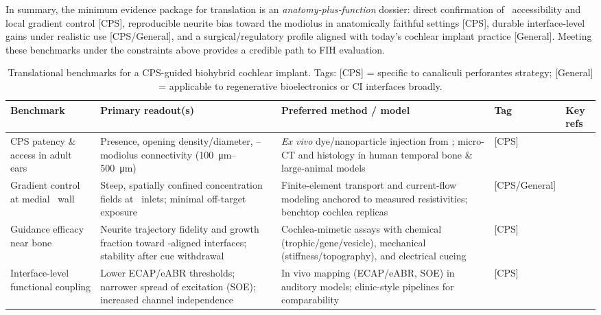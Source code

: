 In summary, the minimum evidence package for translation is an \emph{anatomy‑plus‑function} dossier: direct confirmation of \CPS\ accessibility and local gradient control [CPS], reproducible neurite bias toward the modiolus in anatomically faithful settings [CPS], durable interface‑level gains under realistic use [CPS/General], and a surgical/regulatory profile aligned with today’s cochlear implant practice [General]. Meeting these benchmarks under the constraints above provides a credible path to FIH evaluation.


\begin{table*}[t]
	\caption{Translational benchmarks for a CPS-guided biohybrid cochlear implant. Tags: [CPS] = specific to canaliculi perforantes strategy; [General] = applicable to regenerative bioelectronics or CI interfaces broadly.}
	\centering
	\renewcommand{\arraystretch}{1.2}
	\begin{tabular}{p{} p{} p{} p{} p{}}
		\hline
		\textbf{Benchmark} & \textbf{Primary readout(s)} & \textbf{Preferred method / model} & \textbf{Tag} & \textbf{Key refs} \\
		\hline
		CPS patency \& access in adult ears &
		Presence, opening density/diameter, \CPS--modiolus connectivity (\SIrange{100}{500}{\micro\meter}) &
		\emph{Ex vivo} dye/nanoparticle injection from \ST; micro-CT and histology in human temporal bone \& large-animal models &
		[CPS] &
		\cite{raskandersen2006, sando1971, masuda1971, lim1970} \\
		
		Gradient control at medial \ST\ wall &
		Steep, spatially confined concentration fields at \CPS\ inlets; minimal off-target exposure &
		Finite-element transport and current-flow modeling anchored to measured resistivities; benchtop cochlea replicas &
		[CPS/General] &
		\cite{Micco2006, nella2023} \\
		
		Guidance efficacy near bone &
		Neurite trajectory fidelity and growth fraction toward \CPS-aligned interfaces; stability after cue withdrawal &
		Cochlea-mimetic assays with chemical (trophic/gene/vesicle), mechanical (stiffness/topography), and electrical cueing &
		[CPS] &
		\cite{Kempfle2021, StPeter2022, Chang2020, Scheper2019, tan2012, CarnicerLombarte2024AdvMat} \\
		
		Interface-level functional coupling &
		Lower ECAP/eABR thresholds; narrower spread of excitation (SOE); increased channel independence &
		In vivo mapping (ECAP/eABR, SOE) in auditory models; clinic-style pipelines for comparability &
		[CPS] &
		\cite{wilson2008, wilson2014, Micco2006, Rebscher2008} \\
		

\end{tabular}
\end{table*}
